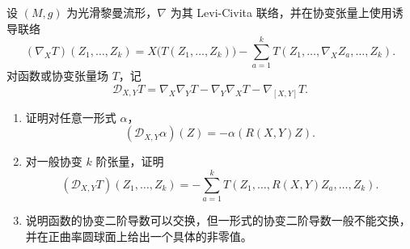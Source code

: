 \begin{exercise}\label{g3:ex:curvature-covariant-tensors}
	设 \((M,g)\) 为光滑黎曼流形，\(\nabla\) 为其 Levi-Civita 联络，并在协变张量上使用诱导联络
	\[
		(\nabla_XT)(Z_1,\ldots,Z_k)
		=X\bigl(T(Z_1,\ldots,Z_k)\bigr)
		-\sum_{a=1}^kT(Z_1,\ldots,\nabla_XZ_a,\ldots,Z_k).
	\]
	对函数或协变张量场 \(T\)，记
	\[
		\mathcal D_{X,Y}T
		=\nabla_X\nabla_YT-\nabla_Y\nabla_XT-\nabla_{[X,Y]}T.
	\]
	\begin{enumerate}
		\item 证明对任意一形式 \(\alpha\)，
		\[
			(\mathcal D_{X,Y}\alpha)(Z)=-\alpha(R(X,Y)Z).
		\]
		\item 对一般协变 \(k\) 阶张量，证明
		\[
			(\mathcal D_{X,Y}T)(Z_1,\ldots,Z_k)
			=-\sum_{a=1}^k
				T(Z_1,\ldots,R(X,Y)Z_a,\ldots,Z_k).
		\]
		\item 说明函数的协变二阶导数可以交换，但一形式的协变二阶导数一般不能交换，并在正曲率圆球面上给出一个具体的非零值。
	\end{enumerate}
\end{exercise}
